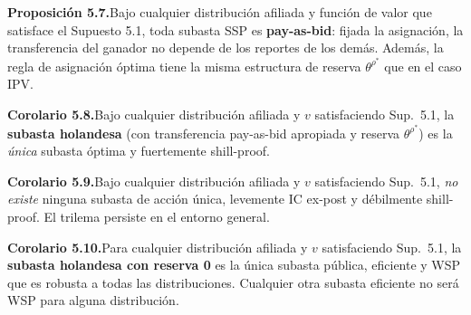 \documentclass[20pt]{extarticle}
\renewcommand{\footnotesize}{\fontsize{18}{22}\selectfont}
\newcommand{\redd}[1]{\textcolor{colred}{\textbf{#1}}}
\newcommand{\grnd}[1]{\textcolor{colgrn}{\textbf{#1}}}
\begin{document}
\begin{minipage}[t]{47cm}
  \vspace{6mm}
  \begin{tcolorbox}[sidebar]
    \footnotesize\textbf{Proposición 5.7.}\enspace Bajo cualquier distribución afiliada y función de valor que satisface el Supuesto 5.1, toda subasta SSP es \textbf{pay-as-bid}: fijada la asignación, la transferencia del ganador no depende de los reportes de los demás. Además, la regla de asignación óptima tiene la misma estructura de reserva $\theta^{\rho^*}$ que en el caso IPV.
  \end{tcolorbox}

  \vspace{6mm}
  \begin{tcolorbox}[rbar]
    \footnotesize\textbf{Corolario 5.8.}\enspace Bajo cualquier distribución afiliada y $v$ satisfaciendo Sup.\ 5.1, la \redd{subasta holandesa} (con transferencia pay-as-bid apropiada y reserva $\theta^{\rho^*}$) es la \emph{única} subasta óptima y fuertemente shill-proof.
  \end{tcolorbox}

  \vspace{6mm}
  \begin{tcolorbox}[bbar]
    \footnotesize\textbf{Corolario 5.9.}\enspace Bajo cualquier distribución afiliada y $v$ satisfaciendo Sup.\ 5.1, \emph{no existe} ninguna subasta de acción única, levemente IC ex-post y débilmente shill-proof. El trilema persiste en el entorno general.
  \end{tcolorbox}

  \vspace{6mm}
  \begin{tcolorbox}[gbar]
    \footnotesize\textbf{Corolario 5.10.}\enspace Para cualquier distribución afiliada y $v$ satisfaciendo Sup.\ 5.1, la \grnd{subasta holandesa con reserva 0} es la única subasta pública, eficiente y WSP que es robusta a todas las distribuciones. Cualquier otra subasta eficiente no será WSP para alguna distribución.
  \end{tcolorbox}

\end{minipage}%
\hspace{2cm}%
\end{document}
